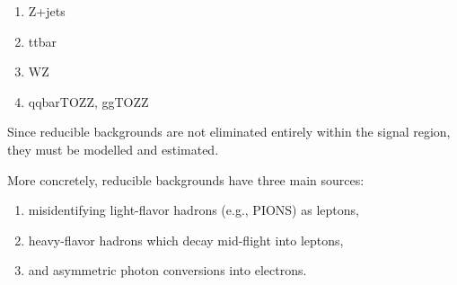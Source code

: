 \begin{enumerate}
    \item Z+jets
    \item ttbar
    \item WZ
    \item qqbarTOZZ, ggTOZZ
\end{enumerate}

Since reducible backgrounds are not eliminated entirely within the signal region, they must be modelled and estimated.

More concretely, reducible backgrounds have three main sources:

\begin{enumerate}
    \item misidentifying light-flavor hadrons (e.g., PIONS) as leptons,
    \item heavy-flavor hadrons which decay mid-flight into leptons,
    \item and asymmetric photon conversions into electrons.
\end{enumerate}

